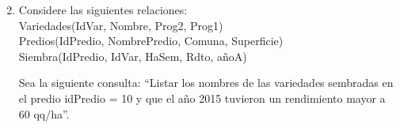 \documentclass{templateNote}
\begin{document}
\begin{enumerate}
    \setcounter{enumi}{1}
    \newpage
    \item Considere las siguientes relaciones: \\
    \hspace*{0.25cm} Variedades(IdVar, Nombre, Prog2, Prog1) \\
    \hspace*{0.25cm} Predios(IdPredio, NombrePredio, Comuna, Superficie) \\
    \hspace*{0.25cm} Siembra(IdPredio, IdVar, HaSem, Rdto, añoA) 
    
    Sea la siguiente consulta: “Listar los nombres de las variedades sembradas en el predio idPredio = 10 y que el año 2015 tuvieron un rendimiento mayor a 60 qq/ha”.


\end{enumerate}
\end{document}

